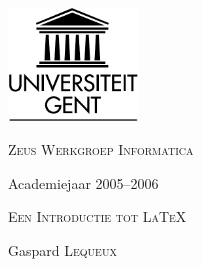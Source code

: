 
\begin{titlepage}

\fontsize{12pt}{14pt}\selectfont

\begin{center}

\includegraphics[height=3cm]{figuren/ruglogo}

\vspace{1cm}

\fontsize{14pt}{17pt}\selectfont
\textsc{\textsc{Zeus} Werkgroep Informatica}
\fontsize{12pt}{14pt}\selectfont
\vspace{0.3cm}

\vspace{2.5cm}

Academiejaar 2005--2006

\vspace{3cm}

\fontsize{17.28pt}{21pt}\selectfont

{\textsc{Een Introductie tot \LaTeX}}

\fontsize{12pt}{14pt}\selectfont

\vspace{4.2cm}

Gaspard \textsc{Lequeux}	

\vspace{1.6cm}


\vspace{2cm}


\end{center}
\end{titlepage}

\thispagestyle{empty}
